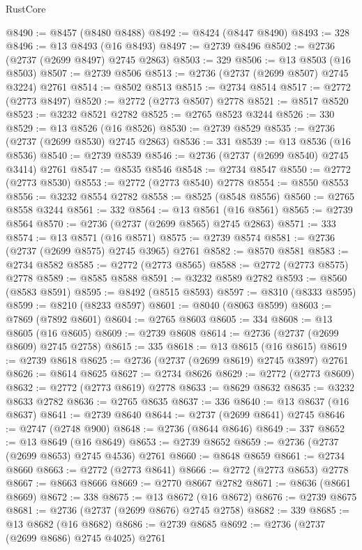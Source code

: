 \begin{lexlean}{RustCore}
\begin{coremodule}
@8490 := @8457 (@8480 @8488)
@8492 := @8424 (@8447 @8490)
@8493 := 328
@8496 := @13 @8493 (@16 @8493)
@8497 := @2739 @8496
@8502 := @2736 (@2737 (@2699 @8497) @2745 @2863)
@8503 := 329
@8506 := @13 @8503 (@16 @8503)
@8507 := @2739 @8506
@8513 := @2736 (@2737 (@2699 @8507) @2745 @3224) @2761
@8514 := @8502 @8513
@8515 := @2734 @8514
@8517 := @2772 (@2773 @8497)
@8520 := @2772 (@2773 @8507) @2778
@8521 := @8517 @8520
@8523 := @3232 @8521 @2782
@8525 := @2765 @8523 @3244
@8526 := 330
@8529 := @13 @8526 (@16 @8526)
@8530 := @2739 @8529
@8535 := @2736 (@2737 (@2699 @8530) @2745 @2863)
@8536 := 331
@8539 := @13 @8536 (@16 @8536)
@8540 := @2739 @8539
@8546 := @2736 (@2737 (@2699 @8540) @2745 @3414) @2761
@8547 := @8535 @8546
@8548 := @2734 @8547
@8550 := @2772 (@2773 @8530)
@8553 := @2772 (@2773 @8540) @2778
@8554 := @8550 @8553
@8556 := @3232 @8554 @2782
@8558 := @8525 (@8548 @8556)
@8560 := @2765 @8558 @3244
@8561 := 332
@8564 := @13 @8561 (@16 @8561)
@8565 := @2739 @8564
@8570 := @2736 (@2737 (@2699 @8565) @2745 @2863)
@8571 := 333
@8574 := @13 @8571 (@16 @8571)
@8575 := @2739 @8574
@8581 := @2736 (@2737 (@2699 @8575) @2745 @3965) @2761
@8582 := @8570 @8581
@8583 := @2734 @8582
@8585 := @2772 (@2773 @8565)
@8588 := @2772 (@2773 @8575) @2778
@8589 := @8585 @8588
@8591 := @3232 @8589 @2782
@8593 := @8560 (@8583 @8591)
@8595 := @8492 (@8515 @8593)
@8597 := @8310 (@8333 @8595)
@8599 := @8210 (@8233 @8597)
@8601 := @8040 (@8063 @8599)
@8603 := @7869 (@7892 @8601)
@8604 := @2765 @8603
@8605 := 334
@8608 := @13 @8605 (@16 @8605)
@8609 := @2739 @8608
@8614 := @2736 (@2737 (@2699 @8609) @2745 @2758)
@8615 := 335
@8618 := @13 @8615 (@16 @8615)
@8619 := @2739 @8618
@8625 := @2736 (@2737 (@2699 @8619) @2745 @3897) @2761
@8626 := @8614 @8625
@8627 := @2734 @8626
@8629 := @2772 (@2773 @8609)
@8632 := @2772 (@2773 @8619) @2778
@8633 := @8629 @8632
@8635 := @3232 @8633 @2782
@8636 := @2765 @8635
@8637 := 336
@8640 := @13 @8637 (@16 @8637)
@8641 := @2739 @8640
@8644 := @2737 (@2699 @8641) @2745
@8646 := @2747 (@2748 @900)
@8648 := @2736 (@8644 @8646)
@8649 := 337
@8652 := @13 @8649 (@16 @8649)
@8653 := @2739 @8652
@8659 := @2736 (@2737 (@2699 @8653) @2745 @4536) @2761
@8660 := @8648 @8659
@8661 := @2734 @8660
@8663 := @2772 (@2773 @8641)
@8666 := @2772 (@2773 @8653) @2778
@8667 := @8663 @8666
@8669 := @2770 @8667 @2782
@8671 := @8636 (@8661 @8669)
@8672 := 338
@8675 := @13 @8672 (@16 @8672)
@8676 := @2739 @8675
@8681 := @2736 (@2737 (@2699 @8676) @2745 @2758)
@8682 := 339
@8685 := @13 @8682 (@16 @8682)
@8686 := @2739 @8685
@8692 := @2736 (@2737 (@2699 @8686) @2745 @4025) @2761

\end{coremodule}
\end{lexlean}
